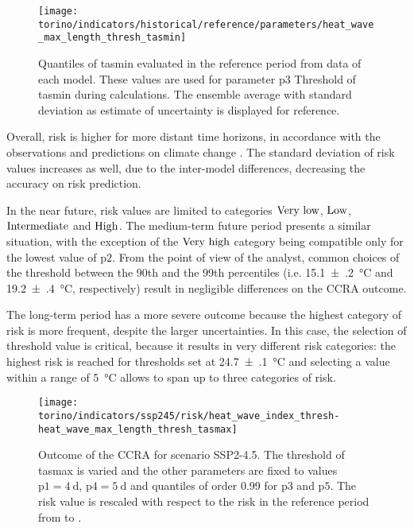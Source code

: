 \begin{figure}
  \centering
  \texttt{[image: torino/indicators/historical/reference/parameters/heat\_wave\_max\_length\_thresh\_tasmin]}
  \caption{Quantiles of \gls{tasmin} evaluated in the reference period from data of each model. These values are used for parameter $\mathrm{p3}$ {Threshold of \gls{tasmin}} during calculations. The ensemble average with standard deviation as estimate of uncertainty is displayed for reference.}
  \label{fig:parameters_heat_wave_max_length_thresh_tasmin}
\end{figure}

Overall, risk is higher for more distant time horizons, in accordance with the observations and predictions on climate change \cite[8-19]{2022IPCCClimateChange}. The standard deviation of risk values increases as well, due to the inter-model differences, decreasing the accuracy on risk prediction.

In the near future, risk values are limited to categories $\text{Very low}$, $\text{Low}$, $\text{Intermediate}$ and $\text{High}$. The medium-term future period presents a similar situation, with the exception of the $\text{Very high}$ category being compatible only for the lowest value of $\mathrm{p2}$. From the point of view of the analyst, common choices of the threshold between the 90th and the 99th percentiles (i.e. \qty{15.1(2)}{\degreeCelsius} and \qty{19.2(4)}{\degreeCelsius}, respectively) result in negligible differences on the \gls{CCRA} outcome.

The long-term period has a more severe outcome because the highest category of risk is more frequent, despite the larger uncertainties. In this case, the selection of threshold value is critical, because it results in very different risk categories: the highest risk is reached for thresholds set at \qty{24.7(1)}{\degreeCelsius} and selecting a value within a range of \qty{5}{\degreeCelsius} allows to span up to three categories of risk.

\begin{figure}
  \centering
  \texttt{[image: torino/indicators/ssp245/risk/heat\_wave\_index\_thresh-heat\_wave\_max\_length\_thresh\_tasmax]}
  \caption{Outcome of the \gls{CCRA} for scenario SSP2-4.5. The threshold of \gls{tasmax} is varied and the other parameters are fixed to values $\mathrm{p1} = \qty{4}{\day}$, $\mathrm{p4} = \qty{5}{\day}$ and quantiles of order 0.99 for $\mathrm{p3}$ and $\mathrm{p5}$. The risk value is rescaled with respect to the risk in the reference period from  to .}
  \label{fig:ssp245_risk_heat_wave_index_thresh-heat_wave_max_length_thresh_tasmax}
\end{figure}

